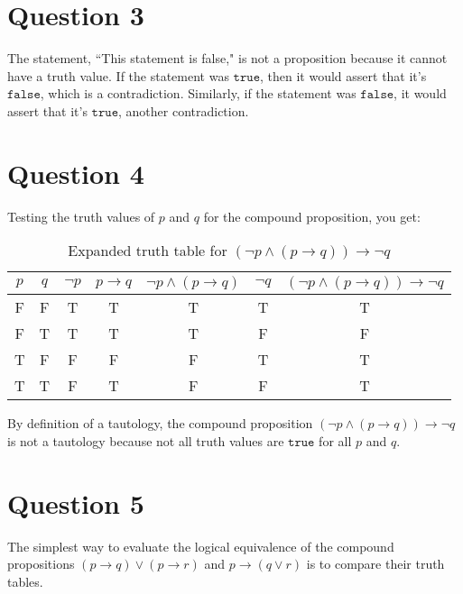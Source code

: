 \documentclass[11pt]{article}
\begin{document}
\section*{Question 3}

The statement, ``This statement is false," is not a proposition because it cannot have a truth value. If the statement was $\texttt{true}$, then it would assert that it's $\texttt{false}$, which is a contradiction. Similarly, if the statement was $\texttt{false}$, it would assert that it's $\texttt{true}$, another contradiction.

\section*{Question 4}

Testing the truth values of $p$ and $q$ for the compound proposition, you get:

\begin{table}[H]
\centering
    \begin{tabular}{|c c|c|c|c|c|c|}
    \hline
    $p$ & $q$ & $\neg p$ & $p \to q$ & $\neg p \wedge (p \to q)$ & $\neg q$ & $(\neg p \wedge (p \to q)) \to \neg q$\\ \hline
    F & F & T & T & T & T & T\\ \hline
    F & T & T & T & T & F & F\\ \hline
    T & F & F & F & F & T & T\\ \hline
    T & T & F & T & F & F & T\\ \hline
    \end{tabular}
    \caption{Expanded truth table for $(\neg p \wedge (p \to q)) \to \neg q$}
    \label{table:2}
\end{table}

By definition of a tautology, the compound proposition $(\neg p \wedge (p \to q)) \to \neg q$ is not a tautology because not all truth values are $\texttt{true}$ for all $p$ and $q$.

\section*{Question 5}

The simplest way to evaluate the logical equivalence of the compound propositions $(p \to q) \vee (p \to r)$ and $p \to (q \vee r)$ is to compare their truth tables.

\begin{comment}
Combine the 2 following tables and highlight the columns with the compound propositions
\end{comment}
\end{document}

